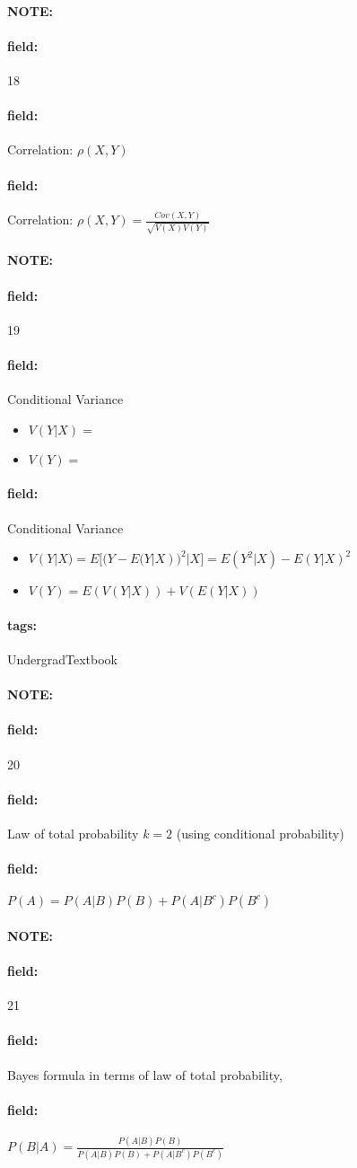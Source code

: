 \documentclass[12pt]{article}
\newenvironment{note}{\paragraph{NOTE:}}{}
\newenvironment{field}{\paragraph{field:}}{}
\newcommand*{\tags}[1]{\paragraph{tags: }#1}
\begin{document}
\begin{note}
  \begin{field}
    \tiny 18
  \end{field}
  \begin{field}
    Correlation: $\rho(X,Y)$
  \end{field}
  \begin{field}
    Correlation: $\rho(X,Y) = \frac{Cov(X,Y)}{\sqrt{V(X)V(Y)}}$
  \end{field}
\end{note}



\begin{note}
  \begin{field}
    \tiny 19
  \end{field}
  \begin{field}
    Conditional Variance
    \begin{itemize}
      \item $V(Y|X) = $
      \item $V(Y) = $
    \end{itemize}
  \end{field}
  \begin{field}
    Conditional Variance
    \begin{itemize}
      \item $V(Y|X) = E\big[(Y - E(Y|X))^2|X\big] = E(Y^2|X) - E(Y|X)^2$
      \item $V(Y) = E(V(Y|X)) + V(E(Y|X))$
    \end{itemize}
  \end{field}
\end{note}


\tags{UndergradTextbook}

\begin{note}
  \begin{field}
    \tiny 20
  \end{field}
  \begin{field}
    Law of total probability $k=2$ (using conditional probability)
  \end{field}
  \begin{field}
    $P(A) = P(A|B)P(B) + P(A|B^c)P(B^c)$

  \end{field}
\end{note}

\begin{note}
  \begin{field}
    \tiny 21
  \end{field}
  \begin{field}
    Bayes formula in terms of law of total probability,
  \end{field}
  \begin{field}
    $P(B|A) = \frac{P(A|B)P(B)}{P(A|B)P(B) + P(A|B^c)P(B^c)}$
  \end{field}
\end{note}
\end{document}
